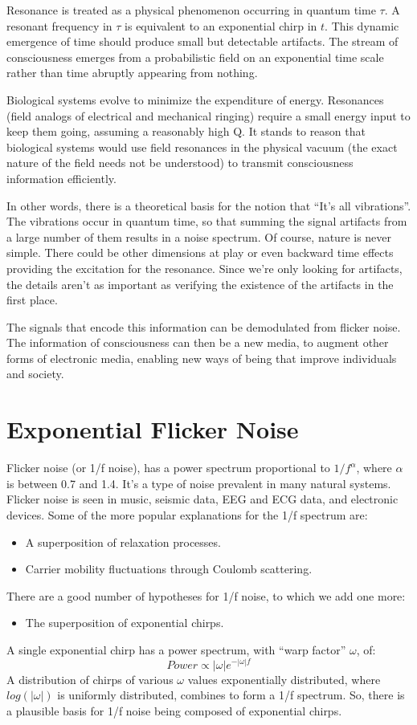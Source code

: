 Resonance is treated as a physical phenomenon occurring in quantum time $\tau$.
A resonant frequency in $\tau$ is equivalent to an exponential chirp in $t$.
This dynamic emergence of time should produce small but detectable artifacts.
The stream of consciousness emerges from a probabilistic field on an
exponential time scale rather than time abruptly appearing from nothing.

Biological systems evolve to minimize the expenditure of energy. Resonances
(field analogs of electrical and mechanical ringing) require a small energy
input to keep them going, assuming a reasonably high Q. It stands to reason
that biological systems would use field resonances in the physical vacuum
(the exact nature of the field needs not be understood)
to transmit consciousness information efficiently.

In other words, there is a theoretical basis for the notion that
``It's all vibrations''.
The vibrations occur in quantum time, so that summing the signal artifacts
from a large number of them results in a noise spectrum.
Of course, nature is never simple. There could be other dimensions at play or
even backward time effects providing the excitation for the resonance.
Since we're only looking for artifacts, the details aren't as important
as verifying the existence of the artifacts in the first place.

The signals that encode this information can be demodulated from flicker noise.
The information of consciousness can then be a new media,
to augment other forms of electronic media,
enabling new ways of being that improve individuals and society.

\section{Exponential Flicker Noise}

Flicker noise (or 1/f noise), has a power spectrum proportional to
$1/f^{\alpha}$, where $\alpha$ is between 0.7 and 1.4.
It's a type of noise prevalent in many natural systems.
Flicker noise \cite{Milotti} is seen in music, seismic data, EEG and ECG data,
and electronic devices.
Some of the more popular explanations for the 1/f spectrum are:
\begin{itemize}
	\item A superposition of relaxation processes.
	\item Carrier mobility fluctuations through Coulomb scattering.
\end{itemize}
There are a good number of hypotheses for 1/f noise, to which we add one more:
\begin{itemize}
	\item The superposition of exponential chirps.
\end{itemize}
A single exponential chirp has a power spectrum,
with ``warp factor'' $\omega$, of:
\begin{equation}
Power \propto |\omega| e^{-|\omega|f}
\end{equation}
A distribution of chirps of various $\omega$ values exponentially distributed,
where $log(|\omega|)$ is uniformly distributed, combines to form a 1/f spectrum.
So, there is a plausible basis for 1/f noise being composed of exponential
chirps.

